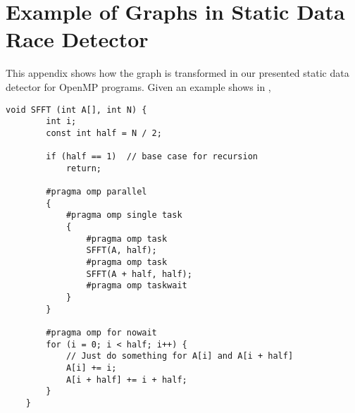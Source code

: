 \chapter{Example of Graphs in Static Data Race Detector}
\label{c:appendix_A}

This appendix shows how the graph is transformed in our presented static data detector for OpenMP programs. Given an example shows in , 

\begin{lstlisting}[caption={Example program},label={l:omptsa-example-program}]
	void SFFT (int A[], int N) {
		int i;
		const int half = N / 2;
		
		if (half == 1)	// base case for recursion
			return;
			
		#pragma omp parallel
		{
			#pragma omp single task
			{
				#pragma omp task
				SFFT(A, half);
				#pragma omp task
				SFFT(A + half, half);
				#pragma omp taskwait
			}
		}
		
		#pragma omp for nowait
		for (i = 0; i < half; i++) {
			// Just do something for A[i] and A[i + half]
			A[i] += i;
			A[i + half] += i + half;
		}
	}
\end{lstlisting}
